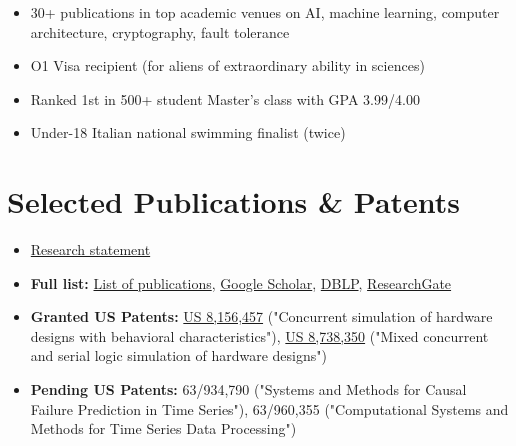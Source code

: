 \documentclass[10pt, letterpaper]{article}
\providecommand{\tightlist}{%
\setlength{\itemsep}{0pt}
\setlength{\parskip}{0pt}}
\begin{document}
  \begin{itemize}
    \tightlist

    \item 30+ publications in top academic venues on AI, machine learning,
      computer architecture, cryptography, fault tolerance

    \item O1 Visa recipient (for aliens of extraordinary ability in
      sciences)

    \item Ranked 1st in 500+ student Master's class with GPA 3.99/4.00

    \item Under-18 Italian national swimming finalist (twice)
  \end{itemize}

  \section{\texorpdfstring{\textbf{Selected Publications \& Patents}}{Selected
  Publications \& Patents}}
  \label{selected-publications-patents}

  \begin{itemize}
    \tightlist

    \item \href{https://gpsaggese.github.io/06_research/}{Research
      statement}

    \item \textbf{Full list:}
      \href{https://gpsaggese.github.io/05_publications/}{List
      of publications}, \href{https://scholar.google.com/scholar?hl=en&as_sdt=0\%2C21&q=gp+saggese&btnG=}{Google
      Scholar},
      \href{https://dblp.uni-trier.de/pers/hd/s/Saggese:Giacinto_Paolo}{DBLP},
      \href{https://www.researchgate.net/scientific-contributions/70377865_GP_Saggese}{ResearchGate}

    \item \textbf{Granted US Patents:}
      \href{https://patents.google.com/patent/US8156457B2/en}{US 8,156,457}
      ("Concurrent simulation of hardware designs with behavioral
      characteristics"), \href{https://patents.google.com/patent/US8738350B2/en}{US
      8,738,350} ("Mixed concurrent and serial logic simulation of hardware
      designs")

    \item \textbf{Pending US Patents:} 63/934,790 ("Systems and Methods
      for Causal Failure Prediction in Time Series"), 63/960,355 ("Computational
      Systems and Methods for Time Series Data Processing")
  \end{itemize}
\end{document}
